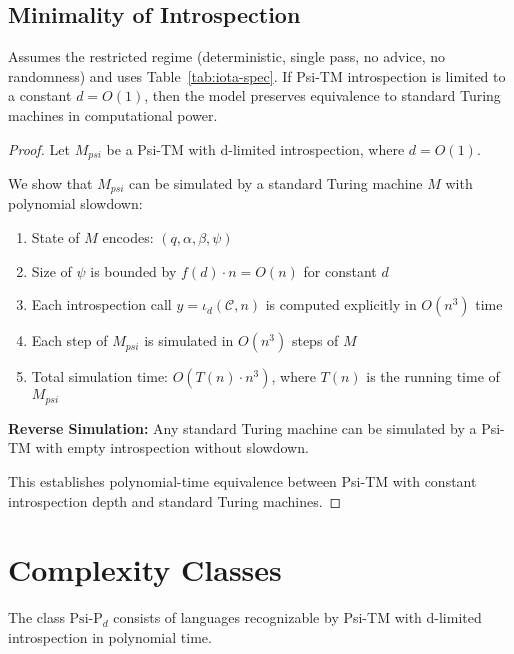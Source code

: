   \subsection{Minimality of Introspection}
  
  \begin{theorem}
  Assumes the restricted regime (deterministic, single pass, no advice, no randomness) and uses Table~\ref{tab:iota-spec}.
  If Psi-TM introspection is limited to a constant $d = O(1)$, then the model preserves equivalence to standard Turing machines in computational power.
  \end{theorem}
  
  \begin{proof}
  Let $M_{psi}$ be a Psi-TM with d-limited introspection, where $d = O(1)$.
  
  We show that $M_{psi}$ can be simulated by a standard Turing machine $M$ with polynomial slowdown:
  
  \begin{enumerate}
  \item State of $M$ encodes: $(q, \alpha, \beta, \psi)$
  \item Size of $\psi$ is bounded by $f(d) \cdot n = O(n)$ for constant $d$
  \item Each introspection call $y=\iota_d(\mathcal{C},n)$ is computed explicitly in $O(n^3)$ time
  \item Each step of $M_{psi}$ is simulated in $O(n^3)$ steps of $M$
  \item Total simulation time: $O(T(n) \cdot n^3)$, where $T(n)$ is the running time of $M_{psi}$
  \end{enumerate}
  
  \textbf{Reverse Simulation:}
  Any standard Turing machine can be simulated by a Psi-TM with empty introspection without slowdown.
  
  This establishes polynomial-time equivalence between Psi-TM with constant introspection depth and standard Turing machines.
  \end{proof}
  
  \section{Complexity Classes}
  
  \begin{definition}
  The class $\text{Psi-P}_d$ consists of languages recognizable by Psi-TM with d-limited introspection in polynomial time.
  \end{definition}
  
